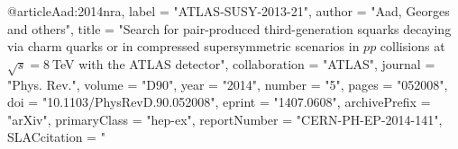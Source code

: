 @article{Aad:2014nra,
      label          = "ATLAS-SUSY-2013-21",
      author         = "Aad, Georges and others",
      title          = "{Search for pair-produced third-generation squarks
                        decaying via charm quarks or in compressed supersymmetric
                        scenarios in $pp$ collisions at $\sqrt{s}=8~$TeV with the
                        ATLAS detector}",
      collaboration  = "ATLAS",
      journal        = "Phys. Rev.",
      volume         = "D90",
      year           = "2014",
      number         = "5",
      pages          = "052008",
      doi            = "10.1103/PhysRevD.90.052008",
      eprint         = "1407.0608",
      archivePrefix  = "arXiv",
      primaryClass   = "hep-ex",
      reportNumber   = "CERN-PH-EP-2014-141",
      SLACcitation   = "%
}

